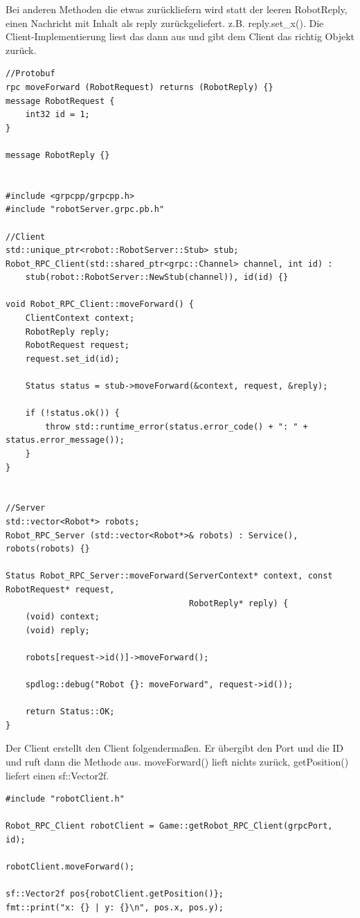 \documentclass{article}
\begin{document}
Bei anderen Methoden die etwas zurückliefern wird statt der leeren RobotReply, einen Nachricht mit Inhalt als reply zurückgeliefert. z.B. reply.set\_x(). Die Client-Implementierung liest das dann aus und gibt dem Client das richtig Objekt zurück.

\begin{verbatim}
//Protobuf
rpc moveForward (RobotRequest) returns (RobotReply) {}
message RobotRequest {
    int32 id = 1;
}

message RobotReply {}


#include <grpcpp/grpcpp.h>
#include "robotServer.grpc.pb.h"

//Client
std::unique_ptr<robot::RobotServer::Stub> stub;
Robot_RPC_Client(std::shared_ptr<grpc::Channel> channel, int id) :
    stub(robot::RobotServer::NewStub(channel)), id(id) {}

void Robot_RPC_Client::moveForward() {
    ClientContext context;
    RobotReply reply;
    RobotRequest request;
    request.set_id(id);

    Status status = stub->moveForward(&context, request, &reply);

    if (!status.ok()) {
        throw std::runtime_error(status.error_code() + ": " + status.error_message());
    }
}


//Server
std::vector<Robot*> robots;
Robot_RPC_Server (std::vector<Robot*>& robots) : Service(), robots(robots) {}

Status Robot_RPC_Server::moveForward(ServerContext* context, const RobotRequest* request,
                                     RobotReply* reply) {
    (void) context;
    (void) reply;
    
    robots[request->id()]->moveForward();

    spdlog::debug("Robot {}: moveForward", request->id());

    return Status::OK;
}
\end{verbatim}

Der Client erstellt den Client folgendermaßen. Er übergibt den Port und die ID und ruft dann die Methode aus. moveForward() lieft nichts zurück, getPosition() liefert einen sf::Vector2f.

\begin{verbatim}
#include "robotClient.h"

Robot_RPC_Client robotClient = Game::getRobot_RPC_Client(grpcPort, id);

robotClient.moveForward();

sf::Vector2f pos{robotClient.getPosition()};
fmt::print("x: {} | y: {}\n", pos.x, pos.y);

\end{verbatim}
\end{document}
